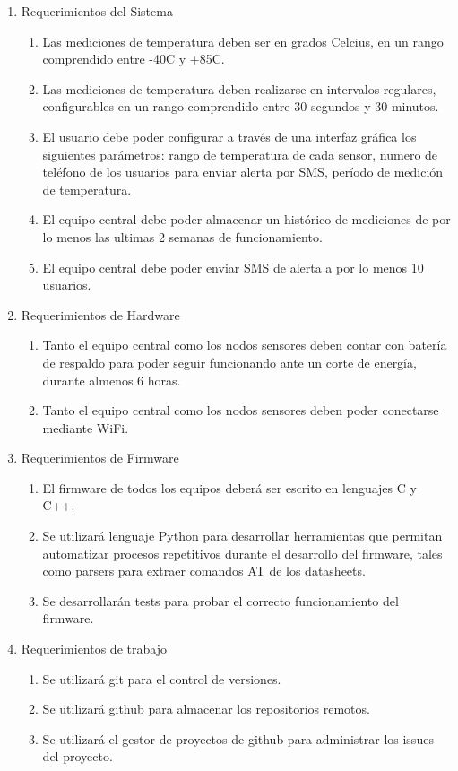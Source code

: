 \documentclass[11pt]{charter}
\begin{document}
\begin{enumerate}
\item Requerimientos del Sistema
	\begin{enumerate}
        \item Las mediciones de temperatura deben ser en grados Celcius, en un rango comprendido entre -40\degree C y +85\degree C.
	\item Las mediciones de temperatura deben realizarse en intervalos regulares, configurables en un rango comprendido entre 30 segundos y 30 minutos.
	\item El usuario debe poder configurar a través de una interfaz gráfica los siguientes parámetros: rango de temperatura de cada sensor, numero de teléfono de los usuarios para enviar alerta por SMS, período de medición de temperatura.
    \item El equipo central debe poder almacenar un histórico de mediciones de por lo menos las ultimas 2 semanas de funcionamiento.
	\item El equipo central debe poder enviar SMS de alerta a por lo menos 10 usuarios.
	\end{enumerate}
\item Requerimientos de Hardware
	\begin{enumerate}
	\item Tanto el equipo central como los nodos sensores deben contar con batería de respaldo para poder seguir funcionando ante un corte de energía, durante almenos 6 horas.
	\item Tanto el equipo central como los nodos sensores deben poder conectarse mediante WiFi.
	\end{enumerate}
\item Requerimientos de Firmware
	\begin{enumerate}
	\item El firmware de todos los equipos deberá ser escrito en lenguajes C y C++.
	\item Se utilizará lenguaje Python para desarrollar herramientas que permitan automatizar procesos repetitivos durante el desarrollo del firmware, tales como parsers para extraer comandos AT de los datasheets.
    \item Se desarrollarán tests para probar el correcto funcionamiento del firmware.
	\end{enumerate}
\item Requerimientos de trabajo
	\begin{enumerate}
	\item Se utilizará git para el control de versiones.
	\item Se utilizará github para almacenar los repositorios remotos.
    \item Se utilizará el gestor de proyectos de github para administrar los issues del proyecto.
	\end{enumerate}
\end{enumerate}
\end{document}
